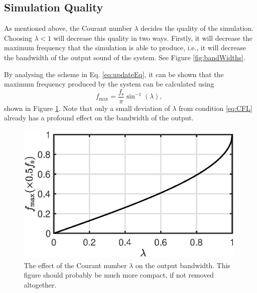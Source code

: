 \documentclass[dvipsnames, reprint]{JASA}
\def\SWcomment[#1]{\textcolor{Bittersweet}{#1}}
\begin{document}
\subsection{Simulation Quality}\label{sec:quality}
As mentioned above, the Courant number $\lambda$ decides the quality of the simulation. Choosing $\lambda < 1$ will decrease this quality in two ways. Firstly, it will decrease the maximum frequency that the simulation is able to produce, i.e., it will decrease the bandwidth of the output sound of the system. See Figure \ref{fig:bandWidths}.
%
\begin{figure}
\end{figure}
%
By analysing the scheme in Eq. \eqref{eq:updateEq}, it can be shown that the maximum frequency produced by the system can be calculated using \cite[Chap. 6]{bilbao2009}
\begin{equation}\label{eq:fmax}
    f_\text{max} = \frac{f_\text{s}}{\pi} \sin^{-1}(\lambda),
\end{equation}
shown in Figure \ref{fig:bandWidthFormula}.
%
Note that only a small deviation of $\lambda$ from condition \eqref{eq:CFL} already has a profound effect on the bandwidth of the output.

\begin{figure}
\includegraphics[width=0.8\reprintcolumnwidth]{bandwidthPlot}
\caption{\label{fig:bandWidthFormula}{The effect of the Courant number $\lambda$ on the output bandwidth. \SWcomment[This figure should probably be much more compact, if not removed altogether.]}}
\end{figure} 
\end{document}
